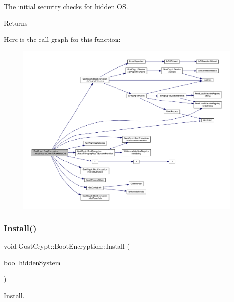 The initial security checks for hidden OS. 

\begin{DoxyReturn}{Returns}

\end{DoxyReturn}
Here is the call graph for this function\+:
\nopagebreak
\begin{figure}[H]
\begin{center}
\leavevmode
\includegraphics[width=350pt]{class_gost_crypt_1_1_boot_encryption_af434150f29efc685046c3f92502eeb65_cgraph}
\end{center}
\end{figure}
\mbox{\label{class_gost_crypt_1_1_boot_encryption_afae7ad7d8fb9fb9137395cb5e378a849}} 
\subsubsection{\texorpdfstring{Install()}{Install()}}
{\footnotesize\ttfamily void Gost\+Crypt\+::\+Boot\+Encryption\+::\+Install (\begin{DoxyParamCaption}\item[{bool}]{hidden\+System }\end{DoxyParamCaption})}



Install. 


